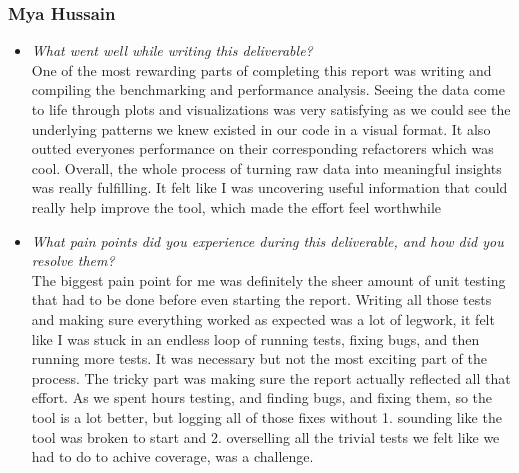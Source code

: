 \documentclass[12pt, titlepage]{article}
\begin{document}
\subsubsection*{Mya Hussain}
\begin{itemize}
  \item \textit{What went well while writing this deliverable?} \\

    One of the most rewarding parts of completing this report was
    writing and compiling
    the benchmarking and performance analysis. Seeing the data come
    to life through plots
    and visualizations was very satisfying as we could see the
    underlying patterns we
    knew existed in our code in a visual format. It also outted
    everyones performance
    on their corresponding refactorers which was cool. Overall, the
    whole process of turning raw data
    into meaningful insights was really fulfilling.  It felt like I
    was uncovering useful information that
    could really help improve the tool, which made the effort feel worthwhile

  \item \textit{What pain points did you experience during this
    deliverable, and how did you resolve them?}\\

    The biggest pain point for me was definitely the sheer amount of
    unit testing that had to
    be done before even starting the report. Writing all those tests
    and making sure everything
    worked as expected was a lot of legwork, it felt like I was stuck
    in an endless loop of running
    tests, fixing bugs, and then running more tests. It was necessary
    but not the most exciting part of
    the process. The tricky part was making sure the report actually
    reflected all that effort. As we spent hours
    testing, and finding bugs, and fixing them, so the tool is a lot
    better, but logging all of those fixes without
    1. sounding like the tool was broken to start and 2. overselling
    all the trivial tests we felt like
    we had to do to achive coverage, was a challenge.

\end{itemize}
\end{document}
